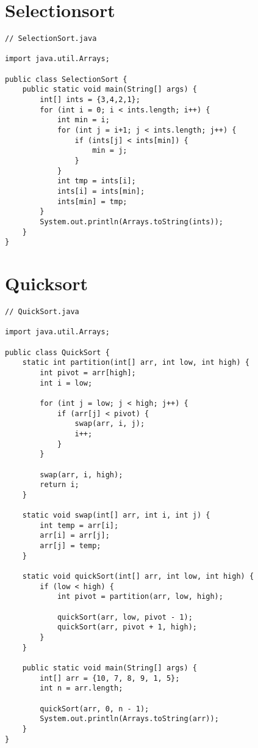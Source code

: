 \section{Selectionsort}
\begin{center}
\begin{lstlisting}
// SelectionSort.java

import java.util.Arrays;

public class SelectionSort {
    public static void main(String[] args) {
        int[] ints = {3,4,2,1};
        for (int i = 0; i < ints.length; i++) {
            int min = i;
            for (int j = i+1; j < ints.length; j++) {
                if (ints[j] < ints[min]) {
                    min = j;
                }
            }
            int tmp = ints[i];
            ints[i] = ints[min];
            ints[min] = tmp;
        }
        System.out.println(Arrays.toString(ints));
    }
}
\end{lstlisting}
\end{center}

\section{Quicksort}
\begin{center}
\begin{lstlisting}
// QuickSort.java

import java.util.Arrays;

public class QuickSort {
    static int partition(int[] arr, int low, int high) {
        int pivot = arr[high];
        int i = low;

        for (int j = low; j < high; j++) {
            if (arr[j] < pivot) {
                swap(arr, i, j);
                i++;
            }
        }

        swap(arr, i, high);  
        return i;
    }

    static void swap(int[] arr, int i, int j) {
        int temp = arr[i];
        arr[i] = arr[j];
        arr[j] = temp;
    }

    static void quickSort(int[] arr, int low, int high) {
        if (low < high) {          
            int pivot = partition(arr, low, high);

            quickSort(arr, low, pivot - 1);
            quickSort(arr, pivot + 1, high);
        }
    }

    public static void main(String[] args) {
        int[] arr = {10, 7, 8, 9, 1, 5};
        int n = arr.length;
      
        quickSort(arr, 0, n - 1);
        System.out.println(Arrays.toString(arr));
    }
}
\end{lstlisting}
\end{center}

